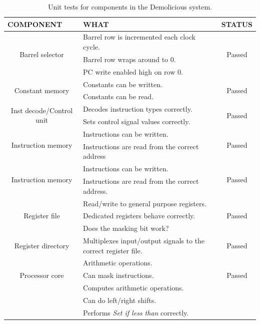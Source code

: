 \documentclass[../main/report.tex]{subfiles}
\begin{document}
\begin{table}[H]
	\centering
	\begin{tabularx}{\textwidth}{|c|X|c|}
	        \multicolumn{1}{l}{\scriptsize COMPONENT} &
	        \multicolumn{1}{l}{\scriptsize WHAT} &
	        \multicolumn{1}{l}{\scriptsize STATUS} \\
	\hline  \multirow{3}{*}{Barrel selector} 		  & Barrel row is incremented each clock cycle.  & \multirow{3}{*}{ Passed } \\
	 										 		  & Barrel row wraps around to 0. & \\			
	 										 		  & PC write enabled high on row 0.& \\								
	\hline  \multirow{2}{*}{Constant memory} 	      & Constants can be written.  & \multirow{2}{*}{ Passed } \\
	 										 		  & Constants can be read. & \\												
	\hline \multirow{2}{*}{Inst decode/Control unit}  & Decodes instruction types correctly. & \multirow{2}{*}{ Passed } \\
		   											  & Sets control signal values correctly. &\\
	\hline \multirow{2}{*}{Instruction memory} 		  & Instructions can be written. & \multirow{2}{*}{ Passed } \\
													  & Instructions are read from the correct address  & \\ 
	\hline \multirow{2}{*}{Instruction memory} 		  & Instructions can be written. & \multirow{2}{*}{ Passed } \\
													  & Instructions are read from the correct address.  & \\ 
	\hline \multirow{3}{*}{Register file} 		  	  & Read/write to general purpose registers. & \multirow{3}{*}{ Passed } \\
													  & Dedicated registers behave correctly.  & \\ 
													  & Does the masking bit work?  & \\ 													  
	\hline  Register directory 		 				  & Multiplexes input/output signals to the correct register file. & Passed  \\
	
	\hline \multirow{3}{*}{Processor core} 		  	  & Arithmetic operations. & \multirow{3}{*}{ Passed } \\
													  & Can mask instructions.  & \\ 
													  
	\hline \multirow{3}{*}{ALU} 		  			  & Computes arithmetic operations. & \multirow{3}{*}{ Passed } \\
													  & Can do left/right shifts.  & \\ 
													  & Performs \emph{Set if less than} correctly. &	\\								  											  
	\hline
	\end{tabularx} 
	\caption{Unit tests for components in the Demolicious system.}
	\label{tab:vhdl_unit_tests}
\end{table}
\end{document}
